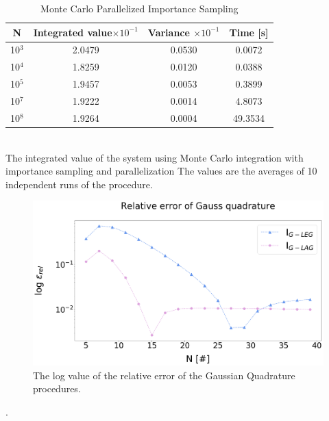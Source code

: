 \documentclass[%
reprint,nofootinbib,
amsmath,amssymb,
aps,
]{revtex4-1}
\begin{document}
\begin{table}[!h]
	\caption{Monte Carlo Parallelized Importance Sampling }
	\begin{tabular}{|c|c|c|c|}
		\hline 
		\hspace{5mm} \textbf{N} \hspace{5mm} & \textbf{Integrated value}$\times 10^{-1}$ & \hspace{3mm} \textbf{Variance} $\times 10^{-1}$ & \hspace{3mm} \textbf{Time  [s]} \hspace{5mm}\\
		\hline 
			10$^3$ & 2.0479  & 0.0530  & 0.0072 \\
			10$^4$ & 1.8259  & 0.0120  & 0.0388 \\
			10$^5$ & 1.9457  & 0.0053  & 0.3899 \\
			10$^7$ & 1.9222  & 0.0014  & 4.8073 \\
			10$^8$ & 1.9264  & 0.0004  & 49.3534 \\
		\hline 
	\end{tabular} \\ [3pt]
	\label{mc_values_par} \centering The integrated value of the system using Monte Carlo integration with importance sampling and parallelization The values are the averages of 10 independent runs of the procedure.
\end{table}

\begin{figure}[H]
	\centering
	\includegraphics[scale = 0.35]{Gauss_lagleg_err.png}
	\caption{\label{laglegerr} The log value of the relative error of the Gaussian Quadrature procedures.}
\end{figure} \newpage 



\newpage. \newpage
\end{document}
